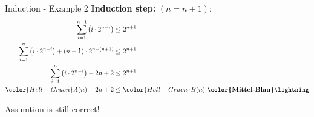 \begin{frame}{Induction - Example 2}
  \textbf{Induction step:}
  $(n = n +1)$:
  \begin{align*}
    \sum\limits^{n+1}_{i=1} \left(i \cdot 2^{n-i} \right)
    \leq &~ 2^{n+1}\\
    \sum\limits^{n}_{i=1} \left(i \cdot 2^{n-i}\right)
    + \left(n + 1\right) \cdot 2^{n - \left(n + 1\right)}
    \leq &~ 2^{n+1}\\
    \sum\limits^{n}_{i=1} \left(i \cdot 2^{n-i}\right)
    + 2n + 2
    \leq &~ 2^{n+1}\\
   {\color{Hell-Gruen}A}(n) + 2n + 2
   \leq &~ {\color{Hell-Gruen}B}(n) ~\textbf{\color{Mittel-Blau}\lightning}
  \end{align*}
  \begin{center}
    \alert{Assumtion is still correct!}
  \end{center}
\end{frame}